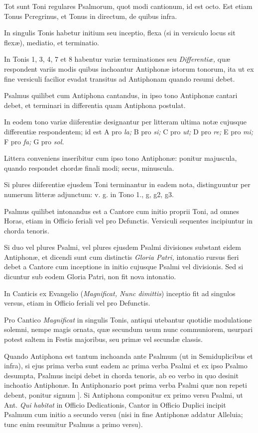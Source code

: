 \documentclass[vesperale_romanum.tex]{subfiles}
\begin{document}
Tot sunt Toni regulares Psalmorum, quot modi cantionum, id est octo. Est etiam Tonus Pcregrinus, et Tonus in directum, de quibus infra.

In singulis Tonis habetur initium seu inceptio, flexa (si in versiculo locus sit flexæ), mediatio, et terminatio.

In Tonis 1, 3, 4, 7 et 8 habentur variæ terminationes seu \textit{Differentiæ,} quæ respondent variis modis quibus inchoantur Antiphonæ istorum tonorum, ita ut ex fine versiculi facilior evadat transitus ad Antiphonam quando resumi debet.

Psalmus quilibet cum Antiphona cantandus, in ipso tono Antiphonæ cantari debet, et terminari in differentia quam Antiphona postulat.

In eodem tono variæ diiferentiæ designantur per litteram ultima notæ cujusque differentiæ respondentem; id est A pro \textit{la;} B pro \textit{si;}
C pro \textit{ut;} D pro \textit{re;} E pro \textit{mi;} F pro \textit{fa;} G pro \textit{sol.}

Littera conveniens inseribitur cum ipso tono Antiphonæ: ponitur majuscula, quando respondet chordæ finali modi; secus, minuscula.

Si plures diiferentiæ ejusdem Toni terminantur in eadem nota, distinguuntur per numerum litteræ adjunctum: v. g. in Tono 1., g, g2, g3.

Psalmus quilibet intonandus est a Cantore cum initio proprii Toni, ad omnes Horas, etiam in Officio feriali vel pro Defunctis. Versiculi sequentes incipiuntur in chorda tenoris.

Si duo vel plures Psalmi, vel plures ejusdem Psalmi divisiones substant eidem Antiphonæ, et dicendi sunt cum distinctis \textit{Gloria Patri,} intonatio rursus fieri debet a Cantore cum inceptione in initio cujusque Psalmi vel divisionis. Sed si dicuntur sub eodem Gloria Patri, non fit nova intonatio.

In Canticis ex Evangelio (\textit{Magnificat, Nunc dimittis}) inceptio fit ad singulos versus, etiam in Officio feriali vel pro Defunctis.

Pro Cantico \textit{Magnificat} in singulis Tonis, antiqui utebantur quotidie modulatione solemni, nempe magis ornata, quæ secundum usum nunc communiorem, usurpari potest saltem in Festis majoribus, seu primæ vel secundæ classis.

Quando Antiphona est tantum inchoanda ante Psalmum (ut in Semiduplicibus et infra), si ejus prima verba sunt eadem ac prima verba Psalmi et ex ipso Psalmo desumpta, Psalmus incipi debet in chorda tenoris, ab eo verbo in quo desinit inchoatio Antiphonæ. In Antiphonario post prima verba Psalmi quæ non repeti debent, ponitur signum ]. Si Antiphona componitur ex primo versu Psalmi, ut Ant. \textit{Qui habitat }in Officio Dedicationis, Cantor in Officio Duplici incipit Psalmum cum initio a secundo versu (nisi in fine Antiphonæ addatur Alleluia; tunc enim resumitur Psalmus a primo versu).
\end{document}
